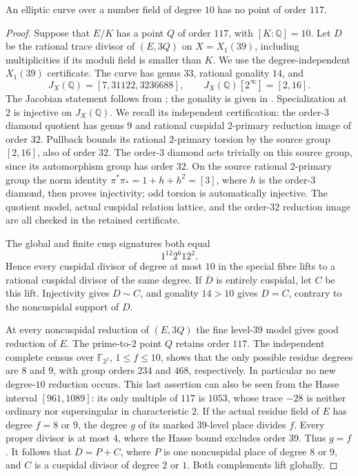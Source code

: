 \begin{proposition}\label{prop:decic-no117}
An elliptic curve over a number field of degree $10$ has no point
of order $117$.
\end{proposition}
\begin{proof}
Suppose that $E/K$ has a point $Q$ of order $117$, with
$[K:\mathbb Q]=10$. Let $D$ be the rational trace divisor of
$(E,3Q)$ on $X=X_1(39)$, including multiplicities if its moduli
field is smaller than $K$.
We use the degree-independent $X_1(39)$ certificate. The curve has
genus $33$, rational gonality $14$, and
\[
 J_X(\mathbb Q)=[7,31122,3236688],\qquad
 J_X(\mathbb Q)[2^\infty]=[2,16].
\]
The Jacobian statement follows from
\cite[Theorem~3.1(2), Theorem~4.13 and Table~2]{DEHMZ};
the gonality is given in \cite[Table~1]{DvH}.
Specialization at $2$ is injective on $J_X(\mathbb Q)$.
We recall its independent certification: the order-$3$ diamond
quotient has genus $9$ and rational cuspidal $2$-primary reduction
image of order $32$. Pullback bounds its rational $2$-primary
torsion by the source group $[2,16]$, also of order $32$.
The order-$3$ diamond acts trivially on this source group, since
its automorphism group has order $32$.
On the source rational $2$-primary group the norm identity
$\pi^*\pi_*=1+h+h^2=[3]$, where $h$ is the order-$3$ diamond,
then proves injectivity; odd torsion is automatically
injective. The quotient model, actual cuspidal relation lattice,
and the order-$32$ reduction image are all checked in the retained
certificate.

The global and finite cusp signatures both equal
\[
                         1^{12}2^6 12^2.
\]
Hence every cuspidal divisor of degree at most $10$ in the special
fibre lifts to a rational cuspidal divisor of the same degree.
If $\overline D$ is entirely cuspidal, let $C$ be this lift.
Injectivity gives $D\sim C$, and gonality $14>10$ gives $D=C$,
contrary to the noncuspidal support of $D$.

At every noncuspidal reduction of $(E,3Q)$ the fine level-$39$
model gives good reduction of $E$. The prime-to-$2$ point $Q$
retains order $117$. The independent complete census over
$\mathbb F_{2^f}$, $1\leq f\leq10$, shows that the only possible
residue degrees are $8$ and $9$, with group orders $234$ and
$468$, respectively. In particular no new degree-$10$ reduction
occurs. This last assertion can also be seen from the Hasse
interval $[961,1089]$: its only multiple of $117$ is $1053$,
whose trace $-28$ is neither ordinary nor supersingular in
characteristic $2$.
If the actual residue field of $E$ has degree $f=8$ or $9$,
the degree $g$ of its marked $39$-level place divides $f$.
Every proper divisor is at most $4$, where the Hasse bound
excludes order $39$. Thus $g=f$.
It follows that $\overline D=P+C$, where $P$ is one noncuspidal
place of degree $8$ or $9$, and $C$ is a cuspidal divisor of degree $2$ or
$1$. Both complements lift globally.


\end{proof}
